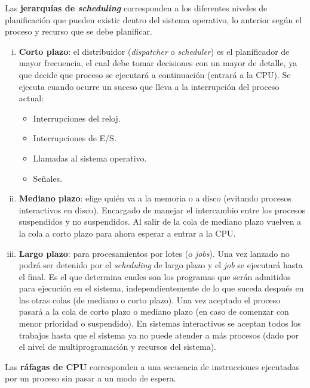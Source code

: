 Las \textbf{jerarquías de \textit{scheduling}} corresponden a los diferentes
niveles de planificación que pueden existir dentro del sistema operativo,
lo anterior según el proceso y recurso que se debe planificar.
\begin{enumerate}[i.]

\item \textbf{Corto plazo}: el distribuidor (\textit{dispatcher} o
\textit{scheduler}) es el planificador de mayor frecuencia, el cual debe tomar
decisiones con un mayor de detalle, ya que decide que proceso se ejecutará a
continuación (entrará a la CPU). Se ejecuta cuando ocurre un suceso que lleva a
la interrupción del proceso actual:

\begin{itemize}
	\item Interrupciones del reloj.
	\item Interrupciones de E/S.
	\item Llamadas al sistema operativo.
	\item Señales.
\end{itemize}

\item \textbf{Mediano plazo}: elige quién va a la memoria o a disco (evitando
procesos interactivos en disco). Encargado de manejar el intercambio entre los
procesos suspendidos y no suspendidos. Al salir de la cola de mediano plazo
vuelven a la cola a corto plazo para ahora esperar a entrar a la CPU.

\item \textbf{Largo plazo}: para procesamientos por lotes (o \textit{jobs}). Una
vez lanzado no podrá ser detenido por el \textit{scheduling} de largo plazo y el
\textit{job} se ejecutará hasta el final. Es el que determina cuales son los
programas que serán admitidos para ejecución en el sistema, independientemente
de lo que suceda después en las otras colas (de mediano o corto plazo). Una vez
aceptado el proceso pasará a la cola de corto plazo o mediano plazo (en caso de
comenzar con menor prioridad o suspendido). En sistemas interactivos se aceptan
todos los trabajos hasta que el sistema ya no puede atender a más procesos (dado
por el nivel de multiprogramación y recursos del sistema).
\end{enumerate}

Las \textbf{ráfagas de CPU} corresponden a una secuencia de instrucciones
ejecutadas por un proceso sin pasar a un modo de espera.


